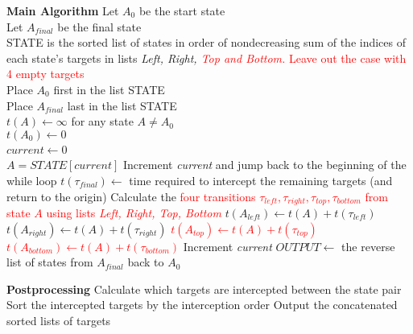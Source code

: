 \documentclass{scrartcl}
\begin{document}
\begin{minipage}{1\linewidth}
\begin{algorithm}[H]
\begin{algorithmic}

\State \textbf{Main Algorithm}
\State Let $A_0$ be the start state \\
Let $A_{final}$ be the final state \\
STATE is the sorted list of states in order of nondecreasing sum of the indices of each state's targets in lists \emph{Left, Right, \textcolor{red}{Top and Bottom.}} \textcolor{red}{Leave out the case with 4 empty targets} \\
Place $A_0$ first in the list STATE \\
Place $A_{final}$ last in the list STATE \\
$t(A) \leftarrow \infty$ for any state $A\neq A_0$  \\
$t(A_0)\leftarrow0 $\\
$current \leftarrow 0$
~\\
\State $A=STATE[current]$
\State Increment \emph{current} and jump back to the beginning of the while loop
\EndIf
{}
\State $t(\tau_{final})\leftarrow$ time required to intercept the remaining targets (and return to the 
\State origin)
\Else
\State Calculate the \textcolor{red}{four transitions $\tau_{left}, \tau_{right}, \tau_{top}, \tau_{bottom}$ from state $A$ using 
\State lists \emph{Left, Right, Top, Bottom}}
\State $t(A_{left}) \leftarrow t(A) + t(\tau_{left})$
\EndIf
{}
\State $t(A_{right}) \leftarrow t(A) + t(\tau_{right})$
\EndIf
\textcolor{red}{
\State $t(A_{top}) \leftarrow t(A) + t(\tau_{top})$
\EndIf
{}
\State $t(A_{bottom}) \leftarrow t(A) + t(\tau_{bottom})$
\EndIf 
}
\EndIf
\State Increment \emph{current}
\EndWhile
\State $OUTPUT \leftarrow$ the reverse list of states from $A_{final}$ back to $A_0$

\end{algorithmic}
\end{algorithm}
\end{minipage}

\begin{minipage}{1\linewidth}
\begin{algorithm}[H]
\begin{algorithmic}

\State \textbf{Postprocessing}
\State Calculate which targets are intercepted between the state pair 
\State Sort the intercepted targets by the interception order
\EndFor
\State Output the concatenated sorted lists of targets

\end{algorithmic}
\end{algorithm}
\end{minipage}

\end{document}
